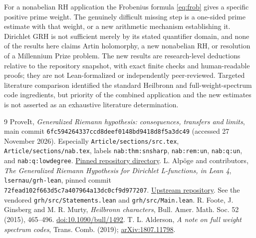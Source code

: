 \documentclass[11pt]{article}
\theoremstyle{remark}\newtheorem{remark}[theorem]{Remark}
\begin{document}
For a nonabelian RH application the Frobenius formula \eqref{eq:frob} gives a specific positive prime weight. The genuinely difficult missing step is a one-sided prime estimate with that weight, or a new arithmetic mechanism establishing it. Dirichlet GRH is not sufficient merely by its stated quantifier domain, and none of the results here claims Artin holomorphy, a new nonabelian RH, or resolution of a Millennium Prize problem. The new results are research-level deductions relative to the repository snapshot, with exact finite checks and human-readable proofs; they are not Lean-formalized or independently peer-reviewed. Targeted literature comparison identified the standard Heilbronn and full-weight-spectrum code ingredients, but priority of the combined application and the new estimates is not asserted as an exhaustive literature determination.

\begin{thebibliography}{9}
 ProveIt, \emph{Generalized Riemann hypothesis: consequences, transfers and limits}, main commit \texttt{6fc594264337ccd8deef0148bd9418d8f5a3dc49} (accessed 27 November 2026). Especially \texttt{Article/sections/src.tex}, \texttt{Article/sections/nab.tex}, labels \texttt{nab:thm:snsharp}, \texttt{nab:rem:un}, \texttt{nab:q:un}, and \texttt{nab:q:lowdegree}. \href{https://github.com/VladimirReshetnikov/ProveIt/tree/6fc594264337ccd8deef0148bd9418d8f5a3dc49/Analysis/GeneralizedRiemannHypothesis/}{Pinned repository directory}.
 L. Alp\"oge and contributors, \emph{The Generalized Riemann Hypothesis for Dirichlet L-functions, in Lean 4}, \texttt{lsernau/grh-lean}, pinned commit \texttt{72fead102f663d5c7a407964a13dc0cf9d977207}. \href{https://github.com/lsernau/grh-lean/tree/72fead102f663d5c7a407964a13dc0cf9d977207}{Upstream repository}. See the vendored \texttt{grh/src/Statements.lean} and \texttt{grh/src/Main.lean}.
 R. Foote, J. Ginsberg and M. R. Murty, \emph{Heilbronn characters}, Bull. Amer. Math. Soc. 52 (2015), 465--496. \href{https://doi.org/10.1090/bull/1492}{doi:10.1090/bull/1492}.
 T. L. Alderson, \emph{A note on full weight spectrum codes}, Trans. Comb. (2019); \href{https://arxiv.org/abs/1807.11798}{arXiv:1807.11798}.
\end{thebibliography}
\end{document}
